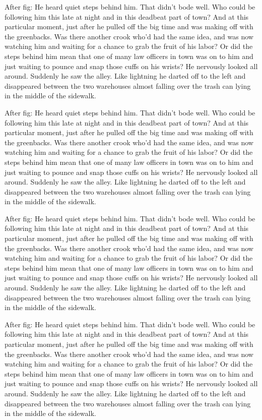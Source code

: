 \documentclass{article}
\begin{document}
After fig: He heard quiet steps behind him. That didn't
bode well. Who could be following him this late at night and in this
deadbeat part of town? And at this particular moment, just after he
pulled off the big time and was making off with the greenbacks. Was
there another crook who'd had the same idea, and was now watching him
and waiting for a chance to grab the fruit of his labor? Or did the
steps behind him mean that one of many law officers in town was on to
him and just waiting to pounce and snap those cuffs on his wrists? He
nervously looked all around. Suddenly he saw the alley. Like lightning
he darted off to the left and disappeared between the two warehouses
almost falling over the trash can lying in the middle of the sidewalk.

After fig: He heard quiet steps behind him. That didn't
bode well. Who could be following him this late at night and in this
deadbeat part of town? And at this particular moment, just after he
pulled off the big time and was making off with the greenbacks. Was
there another crook who'd had the same idea, and was now watching him
and waiting for a chance to grab the fruit of his labor? Or did the
steps behind him mean that one of many law officers in town was on to
him and just waiting to pounce and snap those cuffs on his wrists? He
nervously looked all around. Suddenly he saw the alley. Like lightning
he darted off to the left and disappeared between the two warehouses
almost falling over the trash can lying in the middle of the sidewalk.

After fig: He heard quiet steps behind him. That didn't
bode well. Who could be following him this late at night and in this
deadbeat part of town? And at this particular moment, just after he
pulled off the big time and was making off with the greenbacks. Was
there another crook who'd had the same idea, and was now watching him
and waiting for a chance to grab the fruit of his labor? Or did the
steps behind him mean that one of many law officers in town was on to
him and just waiting to pounce and snap those cuffs on his wrists? He
nervously looked all around. Suddenly he saw the alley. Like lightning
he darted off to the left and disappeared between the two warehouses
almost falling over the trash can lying in the middle of the sidewalk.

After fig: He heard quiet steps behind him. That didn't
bode well. Who could be following him this late at night and in this
deadbeat part of town? And at this particular moment, just after he
pulled off the big time and was making off with the greenbacks. Was
there another crook who'd had the same idea, and was now watching him
and waiting for a chance to grab the fruit of his labor? Or did the
steps behind him mean that one of many law officers in town was on to
him and just waiting to pounce and snap those cuffs on his wrists? He
nervously looked all around. Suddenly he saw the alley. Like lightning
he darted off to the left and disappeared between the two warehouses
almost falling over the trash can lying in the middle of the sidewalk.
\end{document}
